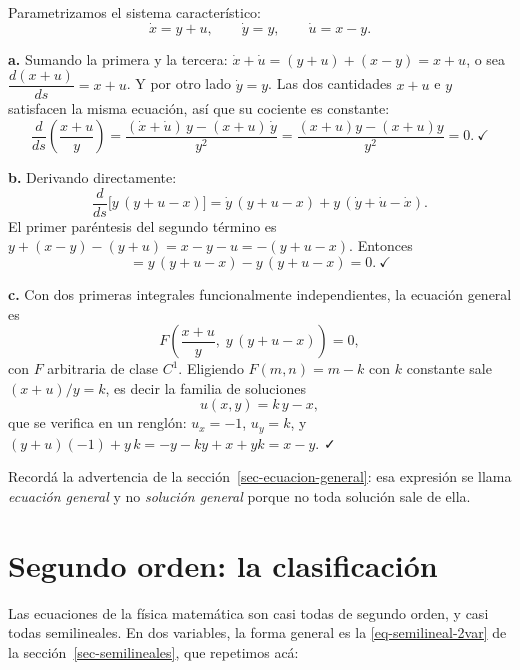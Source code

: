\documentclass[
  spanish,
  a4paper,
]{scrbook}
\theoremstyle{definition}
\theoremstyle{plain}
\theoremstyle{definition}
\theoremstyle{plain}
\theoremstyle{definition}
\theoremstyle{remark}
\begin{document}
\begin{tcolorbox}[enhanced jigsaw, arc=.35mm, bottomrule=.15mm, bottomtitle=1mm, breakable, colback=white, colbacktitle=quarto-callout-tip-color!10!white, colframe=quarto-callout-tip-color-frame, coltitle=black, left=2mm, leftrule=.75mm, opacityback=0, opacitybacktitle=0.6, rightrule=.15mm, title=\textcolor{quarto-callout-tip-color}{\faLightbulb}\hspace{0.5em}{Solución}, titlerule=0mm, toprule=.15mm, toptitle=1mm]

Parametrizamos el sistema característico:
\[\dot x = y+u, \qquad \dot y = y, \qquad \dot u = x-y .\]

\textbf{a.} Sumando la primera y la tercera:
\(\dot x + \dot u = (y+u) + (x-y) = x+u\), o sea
\(\dfrac{d(x+u)}{ds} = x+u\). Y por otro lado \(\dot y = y\). Las dos
cantidades \(x+u\) e \(y\) satisfacen la misma ecuación, así que su
cociente es constante: \[
\frac{d}{ds}\left(\frac{x+u}{y}\right)
= \frac{(\dot x + \dot u)\,y - (x+u)\,\dot y}{y^2}
= \frac{(x+u)y - (x+u)y}{y^2} = 0 . \ \checkmark
\]

\textbf{b.} Derivando directamente: \[
\frac{d}{ds}\Big[y\,(y+u-x)\Big] = \dot y\,(y+u-x) + y\,(\dot y + \dot u - \dot x) .
\] El primer paréntesis del segundo término es
\(y + (x-y) - (y+u) = x - y - u = -(y+u-x)\). Entonces \[
= y\,(y+u-x) - y\,(y+u-x) = 0 . \ \checkmark
\]

\textbf{c.} Con dos primeras integrales funcionalmente independientes,
la ecuación general es \[
F\!\left(\frac{x+u}{y},\; y\,(y+u-x)\right) = 0 ,
\] con \(F\) arbitraria de clase \(C^1\). Eligiendo \(F(m,n) = m - k\)
con \(k\) constante sale \((x+u)/y = k\), es decir la familia de
soluciones \[u(x,y) = k\,y - x ,\] que se verifica en un renglón:
\(u_x = -1\), \(u_y = k\), y
\((y+u)(-1) + y\,k = -y - ky + x + yk = x - y\). ✓

Recordá la advertencia de la sección~\ref{sec-ecuacion-general}: esa
expresión se llama \emph{ecuación general} y no \emph{solución general}
porque no toda solución sale de ella.

\end{tcolorbox}

\section{Segundo orden: la clasificación}\label{sec-clasificacion}

Las ecuaciones de la física matemática son casi todas de segundo orden,
y casi todas semilineales. En dos variables, la forma general es la
\ref{eq-semilineal-2var} de la sección~\ref{sec-semilineales}, que
repetimos acá:
\end{document}
